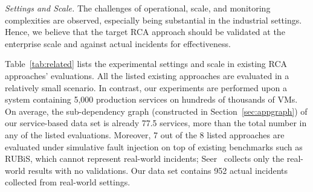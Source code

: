 
\emph{Settings and Scale.} The challenges of operational, scale, and monitoring complexities are observed, especially being substantial in the industrial settings. Hence, we believe that the target RCA approach should be validated at the enterprise scale and against actual incidents for effectiveness. %

Table~\ref{tab:related}  lists  the experimental  settings and scale in existing RCA approaches' evaluations.  All the listed existing approaches are evaluated in a relatively small scenario. 
In contrast, our experiments are performed upon a system containing 5,000 production services on hundreds of thousands of VMs. On average, the sub-dependency graph (constructed in Section~\ref{sec:appgraph}) of our service-based data set is already 77.5 services, more than the total number in any of the listed evaluations. Moreover, 7 out of the 8 listed approaches are evaluated under simulative fault injection on top of existing benchmarks such as RUBiS, which cannot represent real-world incidents;  Seer~\cite{gan2019seer}  collects only the real-world results with no validations. Our data set contains 952 actual incidents collected from real-world settings.